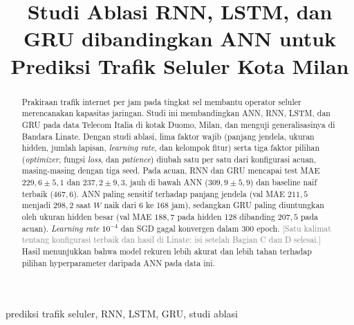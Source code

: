 \documentclass[conference,a4paper]{IEEEtran}
\newcommand{\petunjuk}[1]{\textcolor{gray}{[#1]}}
\begin{document}
\title{Studi Ablasi RNN, LSTM, dan GRU dibandingkan ANN untuk Prediksi Trafik Seluler Kota Milan}

\author{
\and
{}
}

\maketitle

\begin{abstract}
Prakiraan trafik internet per jam pada tingkat sel membantu operator seluler merencanakan kapasitas jaringan. Studi ini membandingkan ANN, RNN, LSTM, dan GRU pada data Telecom Italia di kotak Duomo, Milan, dan menguji generalisasinya di Bandara Linate. Dengan studi ablasi, lima faktor wajib (panjang jendela, ukuran hidden, jumlah lapisan, \textit{learning rate}, dan kelompok fitur) serta tiga faktor pilihan (\textit{optimizer}, fungsi \textit{loss}, dan \textit{patience}) diubah satu per satu dari konfigurasi acuan, masing-masing dengan tiga seed. Pada acuan, RNN dan GRU mencapai test MAE $229{,}6 \pm 5{,}1$ dan $237{,}2 \pm 9{,}3$, jauh di bawah ANN ($309{,}9 \pm 5{,}9$) dan baseline naif terbaik ($467{,}6$). ANN paling sensitif terhadap panjang jendela (val MAE $211{,}5$ menjadi $298{,}2$ saat $W$ naik dari 6 ke 168 jam), sedangkan GRU paling diuntungkan oleh ukuran hidden besar (val MAE $188{,}7$ pada hidden 128 dibanding $207{,}5$ pada acuan). \textit{Learning rate} $10^{-4}$ dan SGD gagal konvergen dalam 300 epoch. \petunjuk{Satu kalimat tentang konfigurasi terbaik dan hasil di Linate: isi setelah Bagian C dan D selesai.} Hasil menunjukkan bahwa model rekuren lebih akurat dan lebih tahan terhadap pilihan hyperparameter daripada ANN pada data ini.
\end{abstract}

\begin{IEEEkeywords}
prediksi trafik seluler, RNN, LSTM, GRU, studi ablasi
\end{IEEEkeywords}

\end{document}
